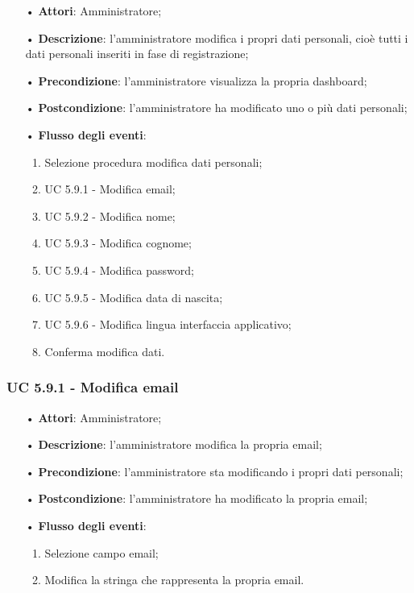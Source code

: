 \begin{itemize}
	\item[•]\textbf{Attori}: Amministratore;
	\item[•]\textbf{Descrizione}: l'amministratore modifica i propri dati personali, cioè tutti i dati personali inseriti in fase di registrazione;
	\item[•]\textbf{Precondizione}: l'amministratore visualizza la propria dashboard;
	\item[•]\textbf{Postcondizione}: l'amministratore ha modificato uno o più dati personali; 
	\item[•]\textbf{Flusso degli eventi}: 
	\begin{enumerate}
		\item Selezione procedura modifica dati personali;
		\item UC 5.9.1 - Modifica email; 
		\item UC 5.9.2 - Modifica nome;
		\item UC 5.9.3 - Modifica cognome;
		\item UC 5.9.4 - Modifica password;
		\item UC 5.9.5 - Modifica data di nascita;
		\item UC 5.9.6 - Modifica lingua interfaccia applicativo;
		\item Conferma modifica dati.
	\end{enumerate}
\end{itemize}
\subsubsection{UC 5.9.1 - Modifica email}
\begin{itemize}
	\item[•]\textbf{Attori}: Amministratore;
	\item[•]\textbf{Descrizione}: l'amministratore modifica la propria email;
	\item[•]\textbf{Precondizione}: l'amministratore sta modificando i propri dati personali;
	\item[•]\textbf{Postcondizione}: l'amministratore ha modificato la propria email; 
	\item[•]\textbf{Flusso degli eventi}: 
	\begin{enumerate}
		\item Selezione campo email;
		\item Modifica la stringa che rappresenta la propria email.
	\end{enumerate}
\end{itemize}
